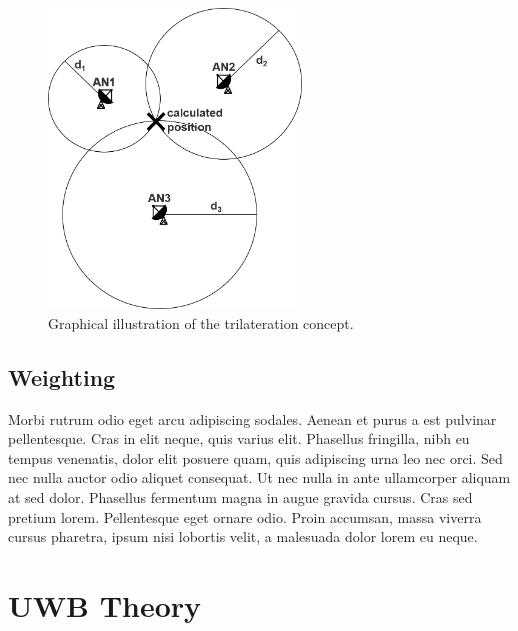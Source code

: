 \begin{figure}[th]
\centering
\includegraphics[width=0.6\textwidth]{Figures/trilateration}
\decoRule
\caption[Trilateration]{Graphical illustration of the trilateration concept.}
\label{fig:trilateration}
\end{figure}


\subsection{Weighting}
Morbi rutrum odio eget arcu adipiscing sodales. Aenean et purus a est pulvinar pellentesque. Cras in elit neque, quis varius elit. Phasellus fringilla, nibh eu tempus venenatis, dolor elit posuere quam, quis adipiscing urna leo nec orci. Sed nec nulla auctor odio aliquet consequat. Ut nec nulla in ante ullamcorper aliquam at sed dolor. Phasellus fermentum magna in augue gravida cursus. Cras sed pretium lorem. Pellentesque eget ornare odio. Proin accumsan, massa viverra cursus pharetra, ipsum nisi lobortis velit, a malesuada dolor lorem eu neque.


\section{UWB Theory}

